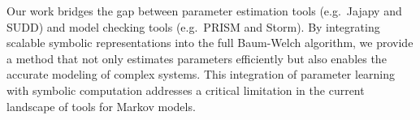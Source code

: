 Our work bridges the gap between parameter estimation tools (e.g.\ Jajapy and SUDD) and model checking tools (e.g.\ PRISM and Storm).
By integrating scalable symbolic representations into the full Baum-Welch algorithm, we provide a method that not only estimates parameters efficiently but also enables the accurate modeling of complex systems.
This integration of parameter learning with symbolic computation addresses a critical limitation in the current landscape of tools for Markov models.









